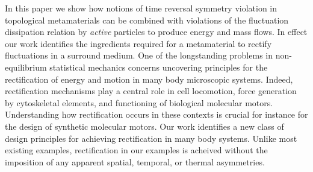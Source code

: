 \documentclass[
 preprint,
 preprintnumbers,
 amsmath,amssymb,
 aps,
 pre,
 longbibliography,
 10pt, twocolumn
]{revtex4-1}
\begin{document}
In this paper we show how notions of time reversal symmetry violation in topological metamaterials can be combined with violations of the fluctuation dissipation relation by \textit{active} particles to produce energy and mass flows. In effect our work identifies the ingredients required for a metamaterial to rectify fluctuations in a surround medium. One of the longstanding problems in non-equilibrium statistical mechanics concerns uncovering principles for the rectification of energy and motion in many body microscopic systems. Indeed, rectification mechanisms play a central role in cell locomotion, force generation by cytoskeletal elements, and functioning of  biological molecular motors. Understanding how rectification occurs in these contexts is crucial for instance for the design of synthetic molecular motors. Our work identifies a new class of design principles for achieving rectification in many body systems. Unlike most existing examples, rectification in our examples is acheived without the imposition of any apparent spatial, temporal, or thermal asymmetries. 


\end{document}
